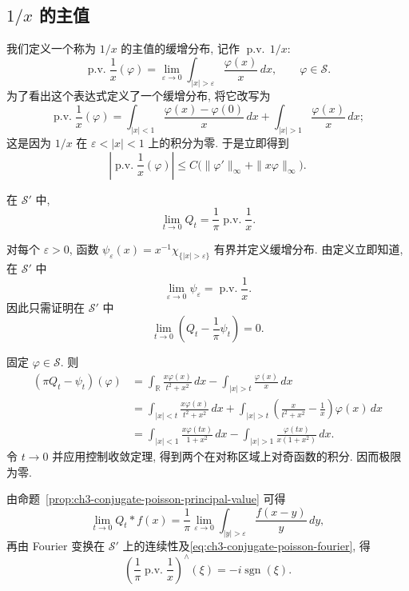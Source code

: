 \subsection{$1/x$ 的主值}
\label{sec:ch3-principal-value-one-over-x}

我们定义一个称为 $1/x$ 的主值的缓增分布, 记作 $\operatorname{p.v.}\,1/x$:
\[
 \operatorname{p.v.}\frac1x(\varphi)
 =\lim_{\varepsilon\to0}\int_{|x|>\varepsilon}\frac{\varphi(x)}{x}\,dx,
 \qquad \varphi\in\mathcal S.
\]
为了看出这个表达式定义了一个缓增分布, 将它改写为
\[
 \operatorname{p.v.}\frac1x(\varphi)
 =\int_{|x|<1}\frac{\varphi(x)-\varphi(0)}{x}\,dx
  +\int_{|x|>1}\frac{\varphi(x)}{x}\,dx;
\]
这是因为 $1/x$ 在 $\varepsilon<|x|<1$ 上的积分为零. 于是立即得到
\[
 \left|\operatorname{p.v.}\frac1x(\varphi)\right|
 \le C\bigl(\|\varphi'\|_\infty+\|x\varphi\|_\infty\bigr).
\]

\begin{Proposition}
\label{prop:ch3-conjugate-poisson-principal-value}
在 $\mathcal S'$ 中,
\[
 \lim_{t\to0}Q_t=\frac1\pi\operatorname{p.v.}\frac1x.
\]
\end{Proposition}

\begin{Proof}
对每个 $\varepsilon>0$, 函数 $\psi_\varepsilon(x)=x^{-1}\chi_{\{|x|>\varepsilon\}}$ 有界并定义缓增分布. 由定义立即知道, 在 $\mathcal S'$ 中
\[
 \lim_{\varepsilon\to0}\psi_\varepsilon=\operatorname{p.v.}\frac1x.
\]
因此只需证明在 $\mathcal S'$ 中
\[
 \lim_{t\to0}\left(Q_t-\frac1\pi\psi_t\right)=0.
\]

\hypertarget{chapter-03-page-063}{}
固定 $\varphi\in\mathcal S$. 则
\[
\begin{aligned}
 (\pi Q_t-\psi_t)(\varphi)
 &=\int_{\mathbb R}\frac{x\varphi(x)}{t^2+x^2}\,dx
   -\int_{|x|>t}\frac{\varphi(x)}x\,dx\\
 &=\int_{|x|<t}\frac{x\varphi(x)}{t^2+x^2}\,dx
   +\int_{|x|>t}\left(\frac{x}{t^2+x^2}-\frac1x\right)\varphi(x)\,dx\\
 &=\int_{|x|<1}\frac{x\varphi(tx)}{1+x^2}\,dx
   -\int_{|x|>1}\frac{\varphi(tx)}{x(1+x^2)}\,dx.
\end{aligned}
\]
令 $t\to0$ 并应用控制收敛定理, 得到两个在对称区域上对奇函数的积分. 因而极限为零.
\end{Proof}

由命题~\ref{prop:ch3-conjugate-poisson-principal-value} 可得
\[
 \lim_{t\to0}Q_t*f(x)
 =\frac1\pi\lim_{\varepsilon\to0}\int_{|y|>\varepsilon}\frac{f(x-y)}y\,dy,
\]
再由 Fourier 变换在 $\mathcal S'$ 上的连续性及\eqref{eq:ch3-conjugate-poisson-fourier}, 得
\[
 \left(\frac1\pi\operatorname{p.v.}\frac1x\right)^{\wedge}(\xi)
 =-i\operatorname{sgn}(\xi).
\]

